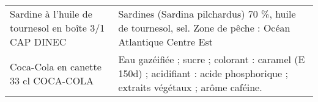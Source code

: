 \begin{longtable}{p{5cm}p{10cm}}
                                                    Sardine à l'huile de tournesol en boîte 3/1 CAP DINEC &                                                                                                                                                                                                                                                                                                                                                                                                                                                                                                                                                                                                                                                                                                                                                                                                                                                                                                                                Sardines (Sardina pilchardus) 70 \%, huile de tournesol, sel.  Zone de pêche : Océan Atlantique Centre Est \\
                                                                     Coca-Cola en canette 33 cl COCA-COLA &                                                                                                                                                                                                                                                                                                                                                                                                                                                                                                                                                                                                                                                                                                                                                                                                                                                                                                               Eau gazéifiée ; sucre ; colorant : caramel (E 150d) ; acidifiant : acide phosphorique ; extraits végétaux ; arôme caféine. \\

\end{longtable}
